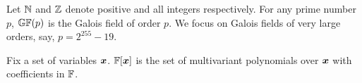 
Let $\mathbb{N}$ and $\mathbb{Z}$ denote positive and all integers
respectively. For any prime number $p$, $\mathbb{GF}(p)$ is the Galois
field of order $p$. We focus on Galois fields of very large orders,
say, $p = 2^{255} - 19$. 

Fix a set of variables $\vx$. $\bbfF[\vx]$ is the set of multivariant
polynomials over $\vx$ with coefficients in $\mathbb{F}$. 
